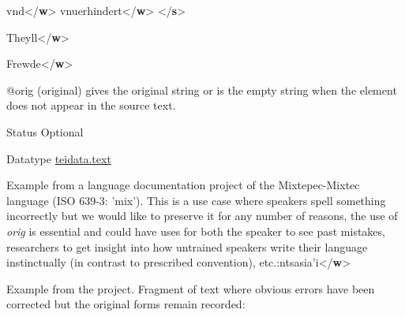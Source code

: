 \begin{reflist}
\begin{sansreflist}
\begin{reflist}
vnd{</\textbf{w}>}\mbox{}\newline 
{}vnuerhindert{</\textbf{w}>}\mbox{}\newline 
{</\textbf{s}>}
    \item[]Theyll{</\textbf{w}>}
    \item[]Frewde{</\textbf{w}>}
\end{reflist}  
    \item[@orig]
  (original) gives the original string or is the empty string when the element does not appear in the source text.
\begin{reflist}
    \item[{Status}]
  Optional
    \item[{Datatype}]
  \hyperref[TEI.teidata.text]{teidata.text}
    \item[]Example from a language documentation project of the Mixtepec-Mixtec language (ISO 639-3: 'mix'). This is a use case where speakers spell something incorrectly but we would like to preserve it for any number of reasons, the use of {\itshape orig} is essential and could have uses for both the speaker to see past mistakes, researchers to get insight into how untrained speakers write their language instinctually (in contrast to prescribed convention), etc.:ntsasia'i{</\textbf{w}>}
    \item[]Example from the  project. Fragment of text where obvious errors have been corrected but the original forms remain recorded:
\end{reflist}
\end{sansreflist}
\end{reflist}
